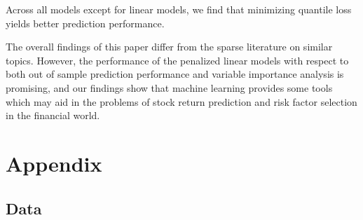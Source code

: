 \documentclass[11pt, a4paper, table]{article}
\begin{document}
Across all models except for linear models, we find that minimizing quantile loss yields better prediction performance.

The overall findings of this paper differ from the sparse literature on similar topics. However, the performance of the penalized linear models with respect to both out of sample prediction performance and variable importance analysis is promising, and our findings show that machine learning provides some tools which may aid in the problems of stock return prediction and risk factor selection in the financial world. 

\newpage

\section{Appendix}

\subsection{Data}

\end{document}

